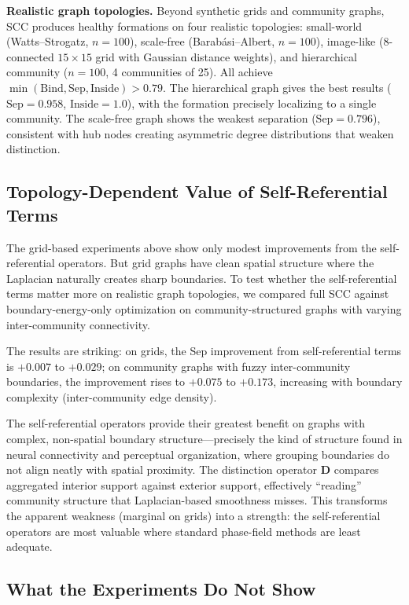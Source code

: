 \documentclass[lettersize,journal]{IEEEtran}
\begin{document}
\textbf{Realistic graph topologies.} Beyond synthetic grids and community graphs, SCC produces healthy formations on four realistic topologies: small-world (Watts--Strogatz, $n=100$), scale-free (Barab\'{a}si--Albert, $n=100$), image-like (8-connected $15 \times 15$ grid with Gaussian distance weights), and hierarchical community ($n=100$, 4 communities of 25). All achieve $\min(\text{Bind}, \text{Sep}, \text{Inside}) > 0.79$. The hierarchical graph gives the best results ($\text{Sep} = 0.958$, $\text{Inside} = 1.0$), with the formation precisely localizing to a single community. The scale-free graph shows the weakest separation ($\text{Sep} = 0.796$), consistent with hub nodes creating asymmetric degree distributions that weaken distinction.

\subsection{Topology-Dependent Value of Self-Referential Terms}

The grid-based experiments above show only modest improvements from the self-referential operators. But grid graphs have clean spatial structure where the Laplacian naturally creates sharp boundaries. To test whether the self-referential terms matter more on realistic graph topologies, we compared full SCC against boundary-energy-only optimization on community-structured graphs with varying inter-community connectivity.

The results are striking: on grids, the Sep improvement from self-referential terms is $+0.007$ to $+0.029$; on community graphs with fuzzy inter-community boundaries, the improvement rises to $+0.075$ to $+0.173$, increasing with boundary complexity (inter-community edge density).

The self-referential operators provide their greatest benefit on graphs with complex, non-spatial boundary structure---precisely the kind of structure found in neural connectivity and perceptual organization, where grouping boundaries do not align neatly with spatial proximity. The distinction operator $\mathbf{D}$ compares aggregated interior support against exterior support, effectively ``reading'' community structure that Laplacian-based smoothness misses. This transforms the apparent weakness (marginal on grids) into a strength: the self-referential operators are most valuable where standard phase-field methods are least adequate.

\subsection{What the Experiments Do Not Show}
\end{document}
